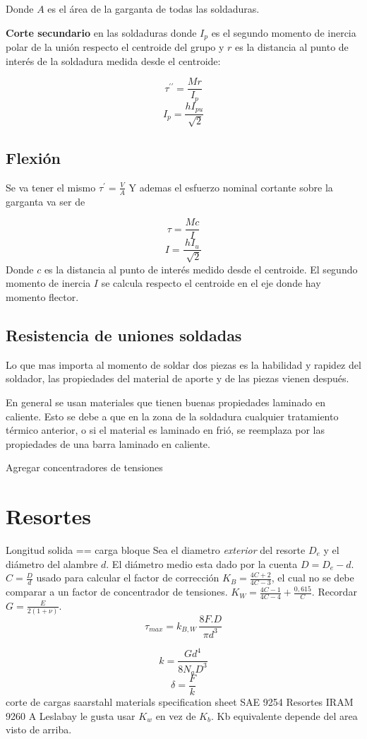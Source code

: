 \documentclass[twocolumn,10pt]{article}
\newcommand{\dprime}{ {\prime \prime} }
\begin{document}
Donde $A$ es el área de la garganta de todas las soldaduras.

\textbf{Corte secundario} en las soldaduras donde $I_p$ es el segundo momento de inercia polar de la unión respecto el centroide del grupo y $r$ es la distancia al punto de interés de la soldadura medida desde el centroide:

$$\tau^\dprime= \frac{Mr}{I_p} $$
$$I_p=\frac{hI_{pu}}{\sqrt[]{2}} $$
\subsection{Flexión}
Se va tener el mismo $\tau^\prime=\frac{V}{A}$
Y ademas el esfuerzo nominal cortante sobre la garganta va ser de 

$$\tau = \frac{Mc}{I} $$
$$I=\frac{hI_{u}}{\sqrt[]{2}} $$
Donde $c$ es la distancia al punto de interés medido desde el centroide. El segundo momento de inercia $I$ se calcula respecto el centroide en el eje donde hay momento flector.
\subsection{Resistencia de uniones soldadas}
Lo que mas importa al momento de soldar dos piezas es la habilidad y rapidez del soldador, las propiedades del material de aporte y de las piezas vienen después. 

En general se usan materiales que tienen buenas propiedades laminado en caliente. Esto se debe a que en la zona de la soldadura cualquier tratamiento térmico anterior, o si el material es laminado en frió, se reemplaza por las propiedades de una barra laminado en caliente.

Agregar concentradores de tensiones
\section{Resortes}
Longitud solida == carga bloque
Sea el diametro \emph{exterior} del resorte $D_e$ y el diámetro del alambre $d$. El diámetro medio esta dado por la cuenta $D=D_e-d$. $C=\frac{D}{d}$ usado para calcular el factor de corrección $K_B = \frac{4C+2}{4C-3} $, el cual no se debe comparar a un factor de concentrador de tensiones. $K_W=\frac{4C-1}{4C-4}+\frac{0,615}{C}$. Recordar $G=\frac{E}{2(1+\nu)}$.
$$\tau_{max} =k_{B,W}\, \frac{8F.D}{\pi d^3} $$

$$k=\frac{Gd^4}{8N_aD^3} $$
$$\delta =\frac{F}{k} $$
corte de cargas
saarstahl materials specification sheet
SAE 9254 Resortes
IRAM 9260
A Leslabay le gusta usar $K_w$ en vez de $K_b$. Kb equivalente depende del area visto de arriba.
\end{document}
